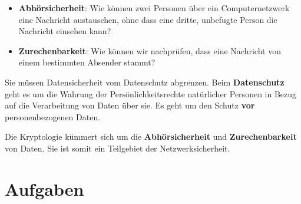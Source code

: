 \begin{itemize}
\item \textbf{Abhörsicherheit}: Wie können zwei Personen über ein Computernetzwerk eine Nachricht austauschen, ohne dass eine dritte, unbefugte Person die Nachricht einsehen kann?
\item \textbf{Zurechenbarkeit}: Wie können wir nachprüfen, dass eine Nachricht von einem bestimmten Absender stammt?
\end{itemize}

\begin{hinweis}
Sie müssen Datensicherheit vom Datenschutz abgrenzen. Beim \textbf{Datenschutz} geht es um die Wahrung der Persönlichkeitsrechte natürlicher Personen in Bezug auf die Verarbeitung von Daten über sie. Es geht um den Schutz \textbf{vor} personenbezogenen Daten.
\end{hinweis}

\begin{important}[Kryptologie]
Die Kryptologie kümmert sich um die \textbf{Abhörsicherheit} und \textbf{Zurechenbarkeit} von Daten. Sie ist somit ein Teilgebiet der Netzwerksicherheit.
\end{important}

\newpage

\section{Aufgaben}
\label{section-aufgaben-it-sicherheit}


